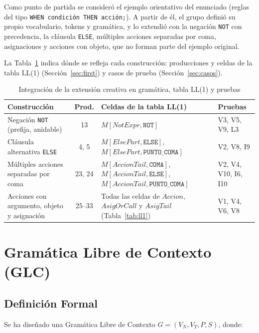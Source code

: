 \documentclass[12pt,a4paper]{article}
\begin{document}
Como punto de partida se consideró el ejemplo orientativo del enunciado (reglas del tipo \texttt{WHEN condición THEN acción;}). A partir de él, el grupo definió su propio vocabulario, tokens y gramática, y lo extendió con la negación \texttt{NOT} con precedencia, la cláusula \texttt{ELSE}, múltiples acciones separadas por coma, asignaciones y acciones con objeto, que no forman parte del ejemplo original.

La Tabla~\ref{tab:ext} indica dónde se refleja cada construcción: producciones y celdas de la tabla LL(1) (Sección~\ref{sec:first}) y casos de prueba (Sección~\ref{sec:casos}).

{\footnotesize
\begin{longtable}{|>{\raggedright\arraybackslash}p{3.6cm}|c|>{\raggedright\arraybackslash}p{6.4cm}|>{\raggedright\arraybackslash}p{2.4cm}|}
\caption{Integración de la extensión creativa en gramática, tabla LL(1) y pruebas}\label{tab:ext}\\ \hline
\textbf{Construcción} & \textbf{Prod.} & \textbf{Celdas de la tabla LL(1)} & \textbf{Pruebas}\\ \hline
\endfirsthead \hline
\endhead
Negación \texttt{NOT} (prefija, anidable) & 13 & $M[\mathit{NotExpr},\mathtt{NOT}]$ & V3, V5, V9, L3\\ \hline
Cláusula alternativa \texttt{ELSE} & 4, 5 & $M[\mathit{ElsePart},\mathtt{ELSE}]$, $M[\mathit{ElsePart},\mathtt{PUNTO\_COMA}]$ & V2, V8, I9\\ \hline
Múltiples acciones separadas por coma & 23, 24 & $M[\mathit{AccionTail},\mathtt{COMA}]$, $M[\mathit{AccionTail},\mathtt{ELSE}]$, $M[\mathit{AccionTail},\mathtt{PUNTO\_COMA}]$ & V2, V4, V10, I6, I10\\ \hline
Acciones con argumento, objeto y asignación & 25--33 & Todas las celdas de $\mathit{Accion}$, $\mathit{AsigOrCall}$ y $\mathit{AsigTail}$ (Tabla~\ref{tab:ll1}) & V1, V4, V6, V8\\ \hline
\end{longtable}
}

\newpage

\section{Gramática Libre de Contexto (GLC)}

\subsection{Definición Formal}
Se ha diseñado una Gramática Libre de Contexto $G = (V_N, V_T, P, S)$, donde:
\end{document}
